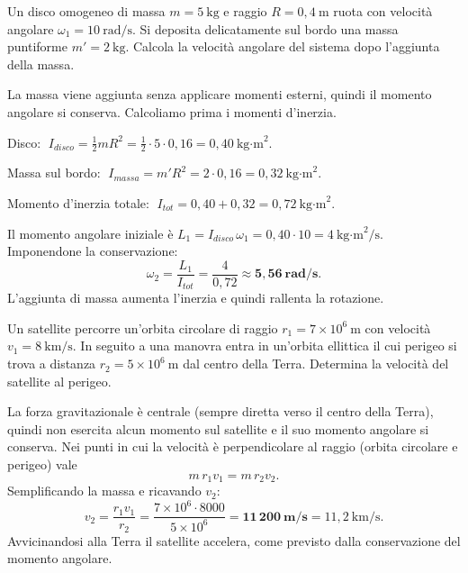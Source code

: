 
\begin{question}[ID=3.2, subtitle={Disco rotante a cui viene aggiunta una massa puntiforme sul bordo}, tags={corpo rigido, conservazione momento angolare, disco}, difficulty=media]
Un disco omogeneo di massa $m = 5\ \text{kg}$ e raggio $R = 0{,}4\ \text{m}$ ruota con velocità angolare $\omega_1 = 10\ \text{rad/s}$. Si deposita delicatamente sul bordo una massa puntiforme $m' = 2\ \text{kg}$. Calcola la velocità angolare del sistema dopo l'aggiunta della massa.
\begin{solution}
La massa viene aggiunta senza applicare momenti esterni, quindi il momento angolare si conserva. Calcoliamo prima i momenti d'inerzia.

\noindent Disco: $\;I_{disco} = \tfrac{1}{2}mR^2 = \tfrac{1}{2}\cdot 5\cdot 0{,}16 = 0{,}40\ \text{kg·m}^2$.

\noindent Massa sul bordo: $\;I_{massa} = m'R^2 = 2\cdot 0{,}16 = 0{,}32\ \text{kg·m}^2$.

\noindent Momento d'inerzia totale: $\;I_{tot} = 0{,}40 + 0{,}32 = 0{,}72\ \text{kg·m}^2$.

Il momento angolare iniziale è $L_1 = I_{disco}\,\omega_1 = 0{,}40\cdot 10 = 4\ \text{kg·m}^2/\text{s}$. Imponendone la conservazione:
\[
\omega_2 = \frac{L_1}{I_{tot}} = \frac{4}{0{,}72} \approx \mathbf{5{,}56\ \text{rad/s}}.
\]
L'aggiunta di massa aumenta l'inerzia e quindi rallenta la rotazione.
\end{solution}
\end{question}


\begin{question}[ID=3.3, subtitle={Satellite che passa da orbita circolare a ellittica — velocità al perigeo}, tags={corpo rigido, conservazione momento angolare, satellite}, difficulty=media]
Un satellite percorre un'orbita circolare di raggio $r_1 = 7\times 10^6\ \text{m}$ con velocità $v_1 = 8\ \text{km/s}$. In seguito a una manovra entra in un'orbita ellittica il cui perigeo si trova a distanza $r_2 = 5\times 10^6\ \text{m}$ dal centro della Terra. Determina la velocità del satellite al perigeo.
\begin{solution}
La forza gravitazionale è centrale (sempre diretta verso il centro della Terra), quindi non esercita alcun momento sul satellite e il suo momento angolare si conserva. Nei punti in cui la velocità è perpendicolare al raggio (orbita circolare e perigeo) vale
\[
m\, r_1 v_1 = m\, r_2 v_2.
\]
Semplificando la massa e ricavando $v_2$:
\[
v_2 = \frac{r_1 v_1}{r_2} = \frac{7\times 10^6 \cdot 8000}{5\times 10^6} = \mathbf{11\,200\ \text{m/s}} = 11{,}2\ \text{km/s}.
\]
Avvicinandosi alla Terra il satellite accelera, come previsto dalla conservazione del momento angolare.
\end{solution}
\end{question}

